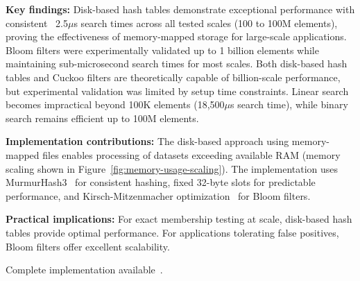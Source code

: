 \documentclass[sigconf]{acmart}
\begin{document}
\textbf{Key findings:} Disk-based hash tables demonstrate exceptional performance with consistent ~2.5$\mu$s search times across all tested scales (100 to 100M elements), proving the effectiveness of memory-mapped storage for large-scale applications. Bloom filters were experimentally validated up to 1 billion elements while maintaining sub-microsecond search times for most scales. Both disk-based hash tables and Cuckoo filters are theoretically capable of billion-scale performance, but experimental validation was limited by setup time constraints. Linear search becomes impractical beyond 100K elements (18,500$\mu$s search time), while binary search remains efficient up to 100M elements.

\textbf{Implementation contributions:} The disk-based approach using memory-mapped files enables processing of datasets exceeding available RAM (memory scaling shown in Figure~\ref{fig:memory-usage-scaling}). The implementation uses MurmurHash3~\cite{mmh3docs} for consistent hashing, fixed 32-byte slots for predictable performance, and Kirsch-Mitzenmacher optimization~\cite{kirsch2008} for Bloom filters.

\textbf{Practical implications:} For exact membership testing at scale, disk-based hash tables provide optimal performance. For applications tolerating false positives, Bloom filters offer excellent scalability.

Complete implementation available~\cite{loginchecker}.
\end{document}
